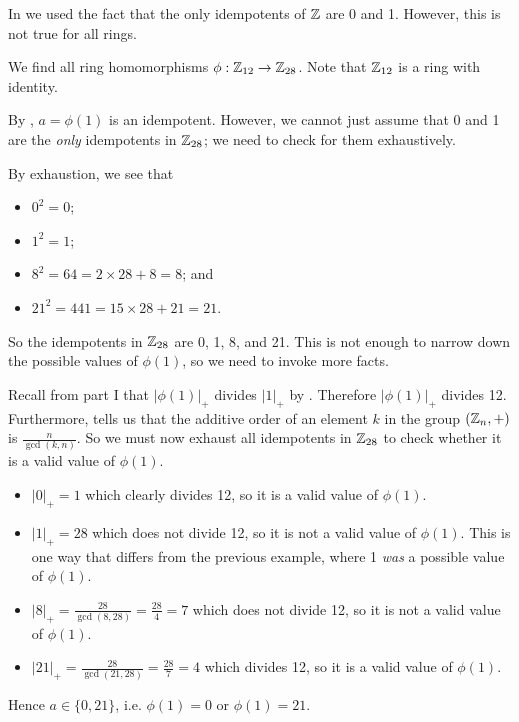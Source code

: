 In  we used the fact that the only idempotents of $\mathbb{Z}$ are 0 and 1. However, this is not true for all rings.

\begin{example}\label{example-homomorphisms-from-Z12-to-Z28}
    We find all ring homomorphisms $\phi: \mathbb{Z}_{12} \to \mathbb{Z}_{28}$. Note that $\mathbb{Z}_{12}$ is a ring with identity.

    By , $a = \phi(1)$ is an idempotent. However, we cannot just assume that 0 and 1 are the \textit{only} idempotents in $\mathbb{Z}_{28}$; we need to check for them exhaustively.

    By exhaustion, we see that
    \begin{itemize}
        \item $0^2 = 0$;
        \item $1^2 = 1$;
        \item $8^2 = 64 = 2 \times 28 + 8 = 8$; and
        \item $21^2 = 441 = 15 \times 28 + 21 = 21$.
    \end{itemize}
    So the idempotents in $\mathbb{Z}_{28}$ are 0, 1, 8, and 21. This is not enough to narrow down the possible values of $\phi(1)$, so we need to invoke more facts.

    Recall from part I that $|\phi(1)|_+$ divides $|1|_+$ by . Therefore $|\phi(1)|_+$ divides 12. Furthermore,  tells us that the additive order of an element $k$ in the group $(\mathbb{Z}_n, +)$ is $\frac{n}{\gcd(k,n)}$. So we must now exhaust all idempotents in $\mathbb{Z}_{28}$ to check whether it is a valid value of $\phi(1)$.
    \begin{itemize}
        \item $|0|_+ = 1$ which clearly divides 12, so it is a valid value of $\phi(1)$.
        \item $|1|_+ = 28$ which does not divide 12, so it is not a valid value of $\phi(1)$. This is one way that differs from the previous example, where 1 \textit{was} a possible value of $\phi(1)$.
        \item $|8|_+ = \frac{28}{\gcd(8,28)} = \frac{28}4 = 7$ which does not divide 12, so it is not a valid value of $\phi(1)$.
        \item $|21|_+ = \frac{28}{\gcd(21,28)} = \frac{28}7 = 4$ which divides 12, so it is a valid value of $\phi(1)$.
    \end{itemize}
    Hence $a \in \{0, 21\}$, i.e. $\phi(1) = 0$ or $\phi(1) = 21$.


\end{example}
